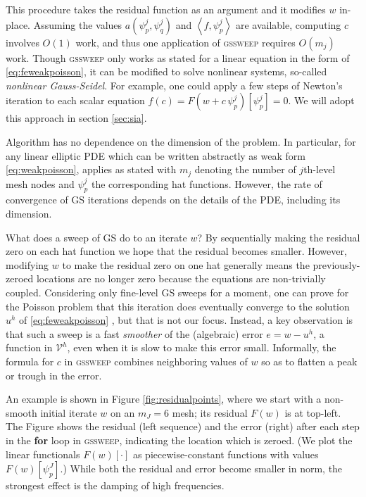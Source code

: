 \documentclass[letterpaper,final,12pt,reqno]{amsart}
\theoremstyle{claim}
\newcommand{\ip}[2]{\left<#1,#2\right>}
\numberwithin{equation}{section}
\numberwithin{figure}{section}
\numberwithin{table}{section}
\numberwithin{theorem}{section}
\begin{document}
This procedure takes the residual function as an argument and it modifies $w$ in-place.  Assuming the values $a(\psi_p^j,\psi_q^j)$ and $\ip{f}{\psi_p^j}$ are available, computing $c$ involves $O(1)$ work, and thus one application of \textsc{gssweep} requires $O(m_j)$ work.  Though \textsc{gssweep} only works as stated for a linear equation in the form of \eqref{eq:feweakpoisson}, it can be modified to solve nonlinear systems, so-called \emph{nonlinear Gauss-Seidel}.  For example, one could apply a few steps of Newton's iteration to each scalar equation $f(c) = F(w+c\,\psi_p^j)[\psi_p^j] = 0$.  We will adopt this approach in section \ref{sec:sia}.

Algorithm  has no dependence on the dimension of the problem.  In particular, for any linear elliptic PDE which can be written abstractly as weak form \eqref{eq:weakpoisson},  applies as stated with $m_j$ denoting the number of $j$th-level mesh nodes and $\psi_p^j$ the corresponding hat functions.  However, the rate of convergence of GS iterations depends on the details of the PDE, including its dimension.

What does a sweep of GS do to an iterate $w$?  By sequentially making the residual zero on each hat function we hope that the residual becomes smaller.  However, modifying $w$ to make the residual zero on one hat generally means the previously-zeroed locations are no longer zero because the equations are non-trivially coupled.  Considering only fine-level GS sweeps for a moment, one can prove for the Poisson problem that this iteration does eventually converge to the solution $u^h$ of \eqref{eq:feweakpoisson} \cite[for example]{Greenbaum1997}, but that is not our focus.  Instead, a key observation is that such a sweep is a fast \emph{smoother} of the (algebraic) error $e=w-u^h$, a function in $\mathcal{V}^h$, even when it is slow to make this error small.  Informally, the formula for $c$ in \textsc{gssweep} combines neighboring values of $w$ so as to flatten a peak or trough in the error.

An example is shown in Figure \ref{fig:residualpoints}, where we start with a non-smooth initial iterate $w$ on an $m_J=6$ mesh; its residual $F(w)$ is at top-left.  The Figure shows the residual (left sequence) and the error (right) after each step in the \textbf{for} loop in \textsc{gssweep}, indicating the location which is zeroed.  (We plot the linear functionals $F(w)[\cdot]$ as piecewise-constant functions with values $F(w)[\psi_p^J]$.)  While both the residual and error become smaller in norm, the strongest effect is the damping of high frequencies.
\end{document}
